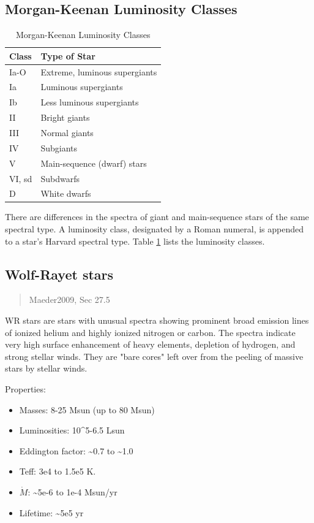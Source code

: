 \subsection{Morgan-Keenan Luminosity Classes}
\begin{table}[htbp]
  \caption{\label{tab:org34fce0d}Morgan-Keenan Luminosity Classes}
  \centering
  \begin{tabular}{ll}
	Class & Type of Star\\
	\hline
	Ia-O & Extreme, luminous supergiants\\
	Ia & Luminous supergiants\\
	Ib & Less luminous supergiants\\
	II & Bright giants\\
	III & Normal giants\\
	IV & Subgiants\\
	V & Main-sequence (dwarf) stars\\
	VI, sd & Subdwarfs\\
	D & White dwarfs\\
  \end{tabular}
\end{table}

There are differences in the spectra of giant and main-sequence stars of the same spectral type. A luminosity class, designated by a Roman numeral, is appended to a star's Harvard spectral type. Table \ref{tab:org34fce0d} lists the luminosity classes.

\subsection{Wolf-Rayet stars}
\label{sec:org05c821b}
\begin{quote}
  Maeder2009, Sec 27.5
\end{quote}

WR stars are stars with unusual spectra showing prominent broad emission lines of ionized helium and highly ionized nitrogen or carbon. The spectra indicate very high surface enhancement of heavy elements, depletion of hydrogen, and strong stellar winds. They are "bare cores" left over from the peeling of massive stars by stellar winds.

Properties:

\begin{itemize}
\item Masses: 8-25 Msun (up to 80 Msun)
\item Luminosities: 10\^{}5-6.5 Lsun
\item Eddington factor: \textasciitilde{}0.7 to \textasciitilde{}1.0
\item Teff: 3e4 to 1.5e5 K.
\item \(\dot{M}\): \textasciitilde{}5e-6 to 1e-4 Msun/yr
\item Lifetime: \textasciitilde{}5e5 yr
\end{itemize}


